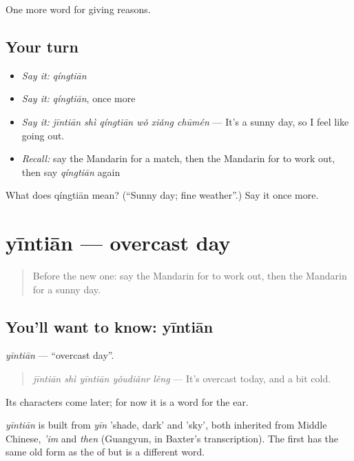 \begin{grammarlens}[title={What you've built}]
One more word for giving reasons.
\end{grammarlens}

\subsection*{Your turn}
\begin{itemize}
\raggedright
  \item \emph{Say it:} \emph{qíngtiān}
  \item \emph{Say it:} \emph{qíngtiān}, once more
  \item \emph{Say it:} \emph{jīntiān shì qíngtiān wǒ xiǎng chūmén} — It's a sunny day, so I feel like going out.
  \item \emph{Recall:} say the Mandarin for a match, then the Mandarin for to work out, then say \emph{qíngtiān} again
\end{itemize}

\begin{tcolorbox}[breakable,colback=teal!4,colframe=teal!35!black,title={Before you move on}]
What does qíngtiān mean? (\textquotedblleft{}Sunny day; fine weather\textquotedblright{}.) Say it once more.
\end{tcolorbox}
\section[yīntiān]{yīntiān — overcast day}

\label{lesson:ZH-C136-yintian}



\begin{quote}
Before the new one: say the Mandarin for to work out, then the Mandarin for a sunny day.
\end{quote}

\subsection*{You'll want to know: yīntiān}
\emph{yīntiān} — \textquotedblleft{}overcast day\textquotedblright{}.

\begin{quote}
\emph{jīntiān shì yīntiān yǒudiǎnr lěng} — It's overcast today, and a bit cold.
\end{quote}

Its characters come later; for now it is a word for the ear.

\begin{cousinweb}
\emph{yīntiān} is built from \emph{yīn} 'shade, dark' and  'sky', both inherited from Middle Chinese, \emph{'im} and \emph{then} (Guangyun, in Baxter's transcription). The first has the same old form as the  of  but is a different word.
\end{cousinweb}

